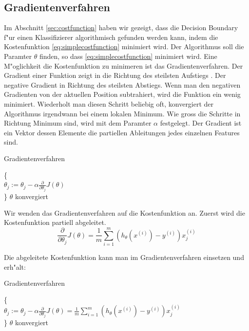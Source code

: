 \documentclass[12pt,a4paper,twoside]{article}
\begin{document}
\subsection{Gradientenverfahren}
\label{sec:gradientdescent}

Im Abschnitt \ref{sec:costfunction} haben wir gezeigt, dass die Decision Boundary f"ur einen Klassifizierer algorithmisch gefunden werden kann, indem die Kostenfunktion \ref{eq:simplecostfunction} minimiert wird. Der Algorithmus soll die Paramter $\theta$ finden, so dass \ref{eq:simplecostfunction} minimiert wird. Eine M"oglichkeit die Kostenfunktion zu minimeren ist das Gradientenverfahren. Der Gradient einer Funktion zeigt in die Richtung des steilsten Aufstiegs \cite{teschl07}. Der negative Gradient in Richtung des steilsten Abstiegs. Wenn man den negativen Gradienten von der aktuellen Position subtrahiert, wird die Funktion ein wenig minimiert. Wiederholt man diesen Schritt beliebig oft, konvergiert der Algorithmus irgendwann bei einem lokalen Minimum. Wie gross die Schritte in Richtung Minimum sind, wird mit dem Paramter $\alpha$ festgelegt. Der Gradient ist ein Vektor dessen Elemente die partiellen Ableitungen jedes einzelnen Features sind.

\begin{algorithm}
\caption{Gradientenverfahren}
\begin{algorithmic}

\Repeat \{ \\
$\theta_j := \theta_j - \alpha \frac{\partial}{\partial \theta_j} J(\theta)$  \\
\}
\Until $\theta$ konvergiert 

 \end{algorithmic}  
\end{algorithm}

Wir wenden das Gradientenverfahren auf die Kostenfunktion an. Zuerst wird die Kostenfunktion partiell abgeleitet.
\begin{equation}
  \label{eq:costderivativ}
  \frac{\partial}{\partial \theta_j} J(\theta) = \frac{1}{m} \sum_{i=1}^m (h_{\theta} (x^{(i)}) - y^{(i)})x_j^{(i)}
\end{equation}

Die abgeleitete Kostenfunktion kann man im Gradientenverfahren einsetzen und erh"alt:
\begin{algorithm}
\caption{Gradientenverfahren}
\begin{algorithmic}

\Repeat \{ \\
$\theta_j := \theta_j - \alpha \frac{\partial}{\partial \theta_j} J(\theta) = \frac{1}{m} \sum_{i=1}^m (h_{\theta} (x^{(i)}) - y^{(i)})x_j^{(i)}$  \\
\}
\Until $\theta$ konvergiert 

 \end{algorithmic}  
\end{algorithm}
\end{document}
